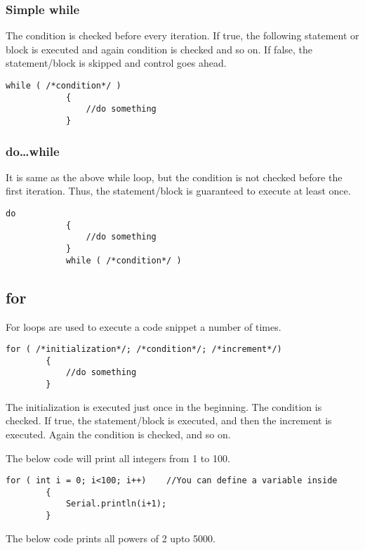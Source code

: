 \documentclass{article}
\begin{document}
		\subsubsection{Simple while}

			The condition is checked before every iteration. If true, the following statement or block is executed and again condition is checked and so on. If false, the statement/block is skipped and control goes ahead.

			\begin{lstlisting}[gobble=12]
			while ( /*condition*/ )
			{
				//do something
			}
			\end{lstlisting}

		\subsubsection{do\ldots while}

			It is same as the above while loop, but the condition is not checked before the first iteration. Thus, the statement/block is guaranteed to execute at least once.

			\begin{lstlisting}[gobble=12]
			do
			{
				//do something
			}
			while ( /*condition*/ )
			\end{lstlisting}

	\subsection{for}

		For loops are used to execute a code snippet a number of times.

		\begin{lstlisting}[gobble=8]
		for ( /*initialization*/; /*condition*/; /*increment*/)
		{
			//do something
		}
		\end{lstlisting}

		The initialization is executed just once in the beginning. The condition is checked. If true, the statement/block is executed, and then the increment is executed. Again the condition is checked, and so on.

		The below code will print all integers from 1 to 100.

		\begin{lstlisting}[gobble=8]
		for ( int i = 0; i<100; i++)	//You can define a variable inside
		{
			Serial.println(i+1);
		}
		\end{lstlisting}

		The below code prints all powers of 2 upto 5000.
\end{document}

